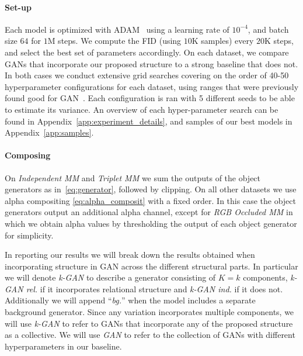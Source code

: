 \documentclass{article}
\begin{document}
\paragraph{Set-up}
Each model is optimized with ADAM~\citep{kingma2015adam} using a learning rate of $10^{-4}$, and batch size $64$ for $1$M steps.
We compute the FID (using $10$K samples) every $20$K steps, and select the best set of parameters accordingly.
On each dataset, we compare GANs that incorporate our proposed structure to a strong baseline that does not.
In both cases we conduct extensive grid searches covering on the order of 40-50 hyperparameter configurations for each dataset, using ranges that were previously found good for GAN~\citep{lucic2017gans, kurach2018gan}.
Each configuration is ran with 5 different seeds to be able to estimate its variance.
An overview of each hyper-parameter search can be found in Appendix~\ref{app:experiment_details}, and samples of our best models in Appendix~\ref{app:samples}.

\paragraph{Composing} On \emph{Independent MM} and \emph{Triplet MM} we sum the outputs of the object generators as in~\eqref{eq:generator}, followed by clipping.
On all other datasets we use alpha compositing \eqref{eq:alpha_composit} with a fixed order.
In this case the object generators output an additional alpha channel, except for \emph{RGB Occluded MM} in which we obtain alpha values by thresholding the output of each object generator for simplicity.

In reporting our results we will break down the results obtained when incorporating structure in GAN across the different structural parts.
In particular we will denote \emph{k-GAN} to describe a generator consisting of $K=k$ components, \emph{k-GAN rel.} if it incorporates relational structure and \emph{k-GAN ind.} if it does not.
Additionally we will append ``\emph{bg.}'' when the model includes a separate background generator.
Since any variation incorporates multiple components, we will use \emph{k-GAN} to refer to GANs that incorporate any of the proposed structure as a collective.
We will use \emph{GAN} to refer to the collection of GANs with different hyperparameters in our baseline.
\end{document}
